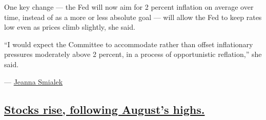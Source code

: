 One key change --- the Fed will now aim for 2 percent inflation on
average over time, instead of as a more or less absolute goal --- will
allow the Fed to keep rates low even as prices climb slightly, she said.

``I would expect the Committee to accommodate rather than offset
inflationary pressures moderately above 2 percent, in a process of
opportunistic reflation,'' she said.

--- \href{https://www.nytimes3xbfgragh.onion/by/jeanna-smialek}{Jeanna
Smialek}

\hypertarget{stocks-rise-following-augusts-highs}{%
\subsection{\texorpdfstring{\protect\hyperlink{stocks-rise-following-augusts-highs}{Stocks
rise, following August's
highs.}}{Stocks rise, following August's highs.}}\label{stocks-rise-following-augusts-highs}}

